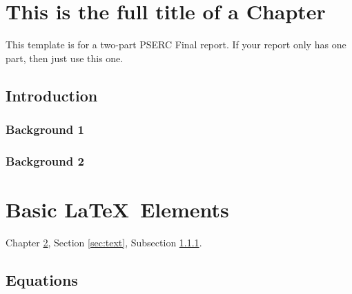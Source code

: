 \documentclass[letterpaper, 12pt, oneside]{book}
\theoremstyle{plain}
\theoremstyle{definition}
\theoremstyle{remark}
\begin{document}



\newpage
{}



\chapter[Short Chapter Title]{This is the full title of a Chapter}
\label{chap:chapter1}
This template is for a two-part PSERC Final report. If your report only has one part, then just use this one.
\section{Introduction} %
\label{sec:introduction}

\subsection{Background 1} %
\label{sub:background_1}


\subsection{Background 2} %
\label{sub:background_2}



\chapter[Table, Figures, and Equations]{Basic \LaTeX~Elements}
\label{chap:chapter2}
Chapter \ref{chap:chapter2}, Section \ref{sec:text}, Subsection \ref{sub:background_1}.


\section{Equations} %
\label{sec:equations}
\end{document}
